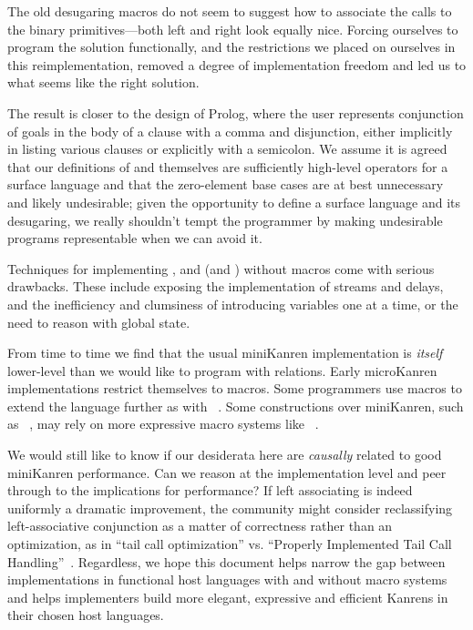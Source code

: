 \documentclass[sigplan,draft,balance,pbalance,natbib=false]{acmart}
\begin{document}
The old desugaring macros do not seem to suggest how to associate the
calls to the binary primitives---both left and right look equally
nice. Forcing ourselves to program the solution functionally, and the
restrictions we placed on ourselves in this reimplementation, removed
a degree of implementation freedom and led us to what seems like the
right solution.

The result is closer to the design of Prolog, where the user
represents conjunction of goals in the body of a clause with a comma
and disjunction, either implicitly in listing various clauses or
explicitly with a semicolon. We assume it is agreed that our
definitions of  and  themselves are
sufficiently high-level operators for a surface language and that the
zero-element base cases are at best unnecessary and likely
undesirable; given the opportunity to define a surface language and
its desugaring, we really shouldn't tempt the programmer by making
undesirable programs representable when we can avoid it.

Techniques for
implementing ,  and
 (and ) without macros come with
serious drawbacks. These include exposing the implementation of
streams and delays, and the inefficiency and clumsiness of introducing
variables one at a time, or the need to reason with global state.

From time to time we find that the usual miniKanren implementation is
\emph{itself} lower-level than we would like to program with
relations. Early microKanren implementations restrict themselves to
 macros. Some programmers use macros to
extend the language further as with
~\cite{keep2009pattern}. Some constructions over
miniKanren, such as
~\cite{ballantyne2020macros}, may rely on
more expressive macro systems like
~\cite{culpepper2012fortifying}.

We would still like to know if our desiderata here are \emph{causally}
related to good miniKanren performance. Can we reason at the
implementation level and peer through to the implications for
performance? If left associating  is indeed uniformly
a dramatic improvement, the community might consider reclassifying
left-associative conjunction as a matter of correctness rather than an
optimization, as in \enquote{tail call optimization} vs.
\enquote{Properly Implemented Tail Call
  Handling}~\cite{felleisen2014requestions}. Regardless, we hope this
document helps narrow the gap between implementations in functional
host languages with and without macro systems and helps implementers
build more elegant, expressive and efficient Kanrens in their chosen
host languages.
\end{document}
